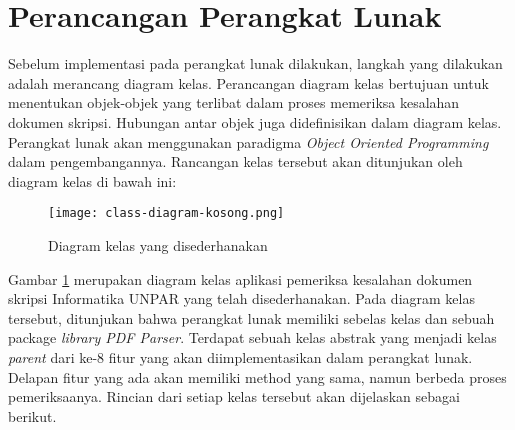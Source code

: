 \section{Perancangan Perangkat Lunak}
Sebelum implementasi pada perangkat lunak dilakukan, langkah yang dilakukan adalah merancang diagram kelas. Perancangan diagram kelas bertujuan untuk menentukan objek-objek yang terlibat dalam proses
memeriksa kesalahan dokumen skripsi. Hubungan antar objek juga didefinisikan dalam diagram kelas. Perangkat lunak akan menggunakan paradigma \textit{Object Oriented Programming} dalam pengembangannya. Rancangan kelas tersebut akan ditunjukan oleh diagram kelas di bawah ini:

\begin{figure}[H]
	\centering	
	\texttt{[image: class-diagram-kosong.png]}
	\caption{Diagram kelas yang disederhanakan}	
	\label{fig:diagram_kelas} 
\end{figure}

Gambar \ref{fig:diagram_kelas} merupakan diagram kelas aplikasi pemeriksa kesalahan dokumen skripsi Informatika UNPAR yang telah disederhanakan. Pada diagram kelas tersebut, ditunjukan bahwa perangkat lunak memiliki sebelas kelas dan sebuah package \textit{library PDF Parser}. Terdapat sebuah kelas abstrak yang menjadi kelas \textit{parent} dari ke-8 fitur yang akan diimplementasikan dalam perangkat lunak. Delapan fitur yang ada akan memiliki method yang sama, namun berbeda proses pemeriksaanya. Rincian dari setiap kelas tersebut akan dijelaskan sebagai berikut.


